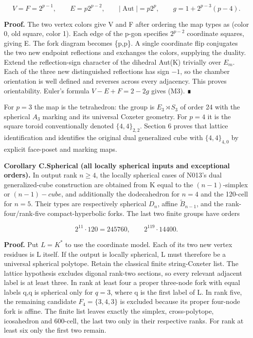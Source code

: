\documentclass[
  11pt,
  a4paper,
]{article}
\begin{document}
\[
V=F=2^{p-1},\qquad E=p2^{p-2},\qquad
|\operatorname{Aut}|=p2^p,\qquad
g=1+2^{p-3}(p-4).
\tag{M3}
\]

\textbf{Proof.} The two vertex colors give V and F after ordering the
map types as (color 0, old square, color 1). Each edge of the p-gon
specifies \(2^{p-2}\) coordinate squares, giving E. The fork diagram
becomes \{p,p\}. A single coordinate flip conjugates the two new
endpoint reflections and exchanges the colors, supplying the duality.
Extend the reflection-sign character of the dihedral Aut(K) trivially
over \(E_m\). Each of the three new distinguished reflections has sign
\(-1\), so the chamber orientation is well defined and reverses across
every adjacency. This proves orientability. Euler's formula
\(V-E+F=2-2g\) gives (M3). ∎

For \(p=3\) the map is the tetrahedron: the group is
\(E_{3}\rtimes S_{3}\) of order 24 with the spherical \(A_{3}\) marking
and its universal Coxeter geometry. For \(p=4\) it is the square toroid
conventionally denoted \(\{4,4\}_{2,2}\). Section 6 proves that lattice
identification and identifies the original dual generalized cube with
\(\{4,4\}_{4,0}\) by explicit face-poset and marking maps.

\textbf{Corollary C.Spherical (all locally spherical inputs and
exceptional orders).} In output rank \(n\ge 4\), the locally spherical
cases of N013's dual generalized-cube construction are obtained from K
equal to the \((n-1)\)-simplex or \((n-1)-cube\), and additionally the
dodecahedron for \(n=4\) and the 120-cell for \(n=5\). Their types are
respectively spherical \(D_n\), affine \(\widetilde B_{n-1}\), and the
rank-four/rank-five compact-hyperbolic forks. The last two finite groups
have orders

\[
2^{11}\cdot120=245760,
\qquad 2^{119}\cdot14400.
\tag{M4}
\]

\textbf{Proof.} Put \(L=K^*\) to use the coordinate model. Each of its
two new vertex residues is L itself. If the output is locally spherical,
L must therefore be a universal spherical polytope. Retain the classical
finite string-Coxeter list. The lattice hypothesis excludes digonal
rank-two sections, so every relevant adjacent label is at least three.
In rank at least four a proper three-node fork with equal labels q,q is
spherical only for \(q=3\), where q is the first label of L. In rank
five, the remaining candidate \(F_{4}=\{3,4,3\}\) is excluded because
its proper four-node fork is affine. The finite list leaves exactly the
simplex, cross-polytope, icosahedron and 600-cell, the last two only in
their respective ranks. For rank at least six only the first two remain.
\end{document}
